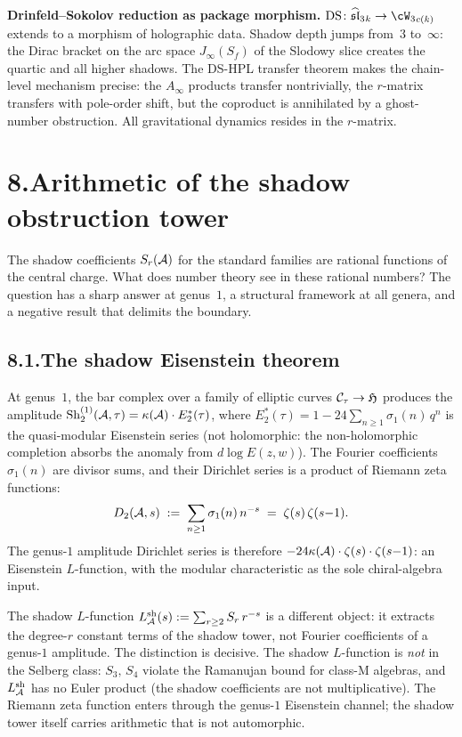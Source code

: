\medskip
\noindent\textbf{Drinfeld--Sokolov reduction as package morphism.}\enspace
$\mathrm{DS}\colon\widehat{\mathfrak{sl}}_3{}_k
\to\cW_3{}_{c(k)}$ extends to a morphism of holographic data.
Shadow depth jumps from~$3$ to~$\infty$: the Dirac bracket on
the arc space $J_\infty(S_f)$ of the Slodowy slice creates the
quartic and all higher shadows. The DS-HPL transfer theorem
makes the chain-level mechanism precise: the $A_\infty$ products
transfer nontrivially, the $r$-matrix transfers with pole-order
shift, but the coproduct is annihilated by a ghost-number
obstruction. All gravitational dynamics resides in the
$r$-matrix.


\section*{8.\quad Arithmetic of the shadow obstruction tower}

The shadow coefficients $S_r(\mathcal{A})$ for the standard families are
rational functions of the central charge. What does number
theory see in these rational numbers? The question has a sharp
answer at genus~$1$, a structural framework at all genera,
and a negative result that delimits the boundary.

\subsection*{8.1.\enspace The shadow Eisenstein theorem}

At genus~$1$, the bar complex over a family of elliptic curves
$\mathcal{C}_\tau\to\mathfrak H$ produces the amplitude
$\mathrm{Sh}_2^{(1)}(\mathcal{A},\tau)=\kappa(\mathcal{A})\cdot E_2^*(\tau)$,
where $E_2^*(\tau)=1-24\sum_{n\ge 1}\sigma_1(n)\,q^n$ is the
quasi-modular Eisenstein series (not holomorphic: the
non-holomorphic completion absorbs the anomaly from
$d\log E(z,w)$). The Fourier coefficients $\sigma_1(n)$ are
divisor sums, and their Dirichlet series is a product of
Riemann zeta functions:
\[
D_2(\mathcal{A},s)
\;:=\;
\sum_{n\ge 1}\sigma_1(n)\,n^{-s}
\;=\;
\zeta(s)\,\zeta(s{-}1).
\]
The genus-$1$ amplitude Dirichlet series is therefore
$-24\kappa(\mathcal{A})\cdot\zeta(s)\cdot\zeta(s{-}1)$: an Eisenstein
$L$-function, with the modular characteristic as the
sole chiral-algebra input.

The shadow $L$-function
$L^{\mathrm{sh}}_{\mathcal{A}}(s):=\sum_{r\ge 2}S_r\,r^{-s}$ is a
different object: it extracts the degree-$r$ constant terms of
the shadow tower, not Fourier coefficients of a genus-$1$
amplitude. The distinction is decisive. The shadow
$L$-function is \emph{not} in the Selberg class:
$S_3,\,S_4$ violate the Ramanujan bound for class-M algebras,
and $L^{\mathrm{sh}}_{\mathcal{A}}$ has no Euler product (the shadow
coefficients are not multiplicative). The Riemann zeta
function enters through the genus-$1$ Eisenstein channel; the
shadow tower itself carries arithmetic that is not automorphic.

